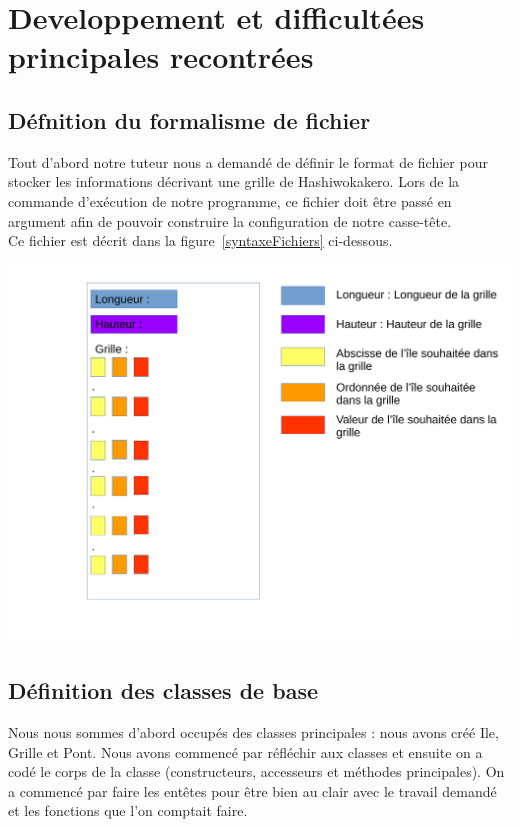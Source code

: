 \documentclass[french]{article}
\begin{document}
\section{\LARGE Developpement et difficultées principales recontrées}
    \subsection{\Large Défnition du formalisme de fichier}
    \hspace{0.5cm} Tout d'abord notre tuteur nous a demandé de définir le format de fichier pour stocker les informations décrivant une grille de Hashiwokakero. Lors de la commande d'exécution de notre programme, ce fichier doit être passé en argument afin de pouvoir construire la configuration de notre casse-tête. \\
    Ce fichier est décrit dans la figure~\ref{syntaxeFichiers} ci-dessous. \newline
    \centerline{\includegraphics[width=1.3\textwidth]{Formalisme_du_jeu.pdf}}
    \label{syntaxeFichiers}
    \subsection{\Large Définition des classes de base}
    \hspace{0.5cm} Nous nous sommes d'abord occupés des classes principales : nous avons créé Ile, Grille et Pont. Nous avons commencé par réfléchir aux classes et ensuite on a codé le corps de la classe (constructeurs, accesseurs et méthodes principales). On a commencé par faire les entêtes pour être bien au clair avec le travail demandé et les fonctions que l'on comptait faire.
\end{document}
